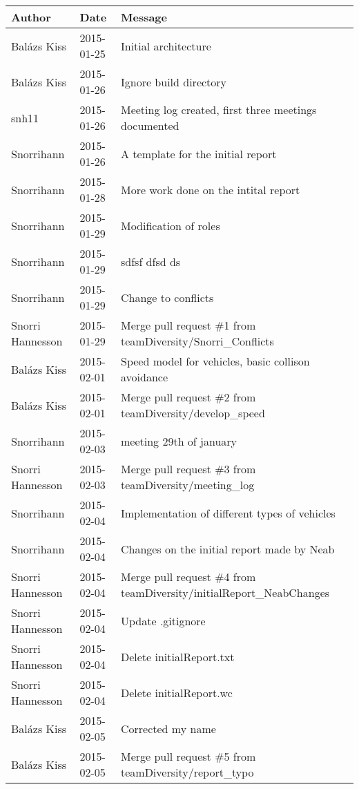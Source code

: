 \begin{center}
\begin{longtabu} to \textwidth {|
    X[4,l]|
    X[3,c]|
    X[8,l]|}
    \hline
    \textbf{Author} & \textbf{Date} & \textbf{Message} \\ \hline
Balázs Kiss & 2015-01-25 & Initial architecture \\ \hline
Balázs Kiss & 2015-01-26 & Ignore build directory \\ \hline
snh11 & 2015-01-26 & Meeting log created, first three meetings documented \\ \hline
Snorrihann & 2015-01-26 & A template for the initial report \\ \hline
Snorrihann & 2015-01-28 & More work done on the intital report \\ \hline
Snorrihann & 2015-01-29 & Modification of roles \\ \hline
Snorrihann & 2015-01-29 & sdfsf dfsd ds \\ \hline
Snorrihann & 2015-01-29 & Change to conflicts \\ \hline
Snorri Hannesson & 2015-01-29 & Merge pull request \#1 from teamDiversity/Snorri\_Conflicts \\ \hline
Balázs Kiss & 2015-02-01 & Speed model for vehicles, basic collison avoidance \\ \hline
Balázs Kiss & 2015-02-01 & Merge pull request \#2 from teamDiversity/develop\_speed \\ \hline
Snorrihann & 2015-02-03 & meeting 29th of january \\ \hline
Snorri Hannesson & 2015-02-03 & Merge pull request \#3 from teamDiversity/meeting\_log \\ \hline
Snorrihann & 2015-02-04 & Implementation of different types of vehicles \\ \hline
Snorrihann & 2015-02-04 & Changes on the initial report made by Neab \\ \hline
Snorri Hannesson & 2015-02-04 & Merge pull request \#4 from teamDiversity/initialReport\_NeabChanges \\ \hline
Snorri Hannesson & 2015-02-04 & Update .gitignore \\ \hline
Snorri Hannesson & 2015-02-04 & Delete initialReport.txt \\ \hline
Snorri Hannesson & 2015-02-04 & Delete initialReport.wc \\ \hline
Balázs Kiss & 2015-02-05 & Corrected my name \\ \hline
Balázs Kiss & 2015-02-05 & Merge pull request \#5 from teamDiversity/report\_typo \\ \hline

\end{longtabu}
\end{center}
